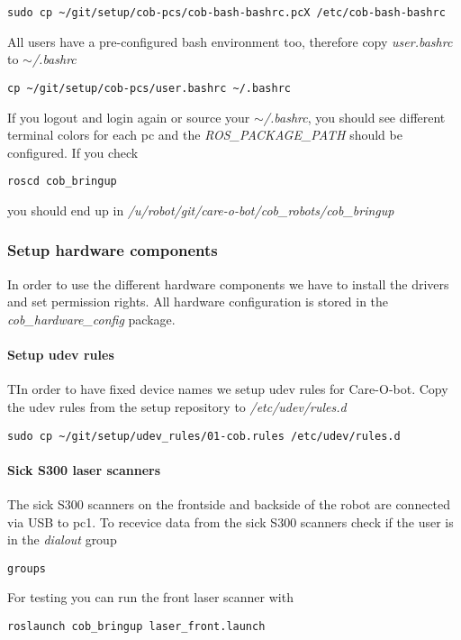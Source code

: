 \begin{lstlisting}
sudo cp ~/git/setup/cob-pcs/cob-bash-bashrc.pcX /etc/cob-bash-bashrc
\end{lstlisting}

All users have a pre-configured bash environment too, therefore copy \textit{user.bashrc} to \textit{$\sim$/.bashrc}
\begin{lstlisting}
cp ~/git/setup/cob-pcs/user.bashrc ~/.bashrc
\end{lstlisting}

If you logout and login again or source your \textit{$\sim$/.bashrc}, you should see different terminal colors for each pc and the \textit{ROS\_PACKAGE\_PATH} should be configured. If you check 
\begin{lstlisting}
roscd cob_bringup
\end{lstlisting}
you should end up in \textit{/u/robot/git/care-o-bot/cob\_robots/cob\_bringup}

\subsubsection{Setup hardware components}
In order to use the different hardware components we have to install the drivers and set permission rights. All hardware configuration is stored in the \textit{cob\_hardware\_config} package.

\paragraph{Setup udev rules}
TIn order to have fixed device names we setup udev rules for Care-O-bot. Copy the udev rules from the setup repository to \textit{/etc/udev/rules.d}
\begin{lstlisting}
sudo cp ~/git/setup/udev_rules/01-cob.rules /etc/udev/rules.d
\end{lstlisting}

\paragraph{Sick S300 laser scanners}
The sick S300 scanners on the frontside and backside of the robot are connected via USB to pc1. To recevice data from the sick S300 scanners check if the user is in the \textit{dialout} group
\begin{lstlisting}
groups
\end{lstlisting}

For testing you can run the front laser scanner with
\begin{lstlisting}
roslaunch cob_bringup laser_front.launch
\end{lstlisting}

